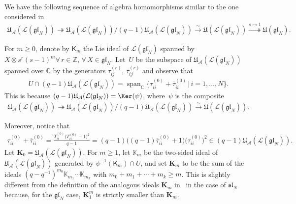 We have the following sequence of algebra homomorphisms similar to the one considered in~\cite{GuMa}
\begin{gather*}
\mathfrak{U}_{\mathcal{A}}(\mathcal{L}(\mathfrak{gl}_N)) \twoheadrightarrow
\mathfrak{U}_{\mathcal{A}}(\mathcal{L}(\mathfrak{gl}_N)) /
(q-1)\mathfrak{U}_{\mathcal{A}}(\mathcal{L}(\mathfrak{gl}_N)) \stackrel{\sim}{\longrightarrow}
\mathfrak{U}(\mathcal{L}(\mathfrak{gl}_N)) \stackrel{s\mapsto 1}{\twoheadrightarrow}
\mathfrak{U}(\mathfrak{gl}_N).
\end{gather*}



For $m\ge 0$, denote by $\mathsf{K}_m$ the Lie ideal of $\mathcal{L}(\mathfrak{gl}_N)$
spanned by $X\otimes s^r (s-1)^m \forall\, r\in\mathbb{Z}$, $\forall\, X\in\mathfrak{gl}_N$.
Let~$U$ be the subspace of $\mathfrak{U}_{\mathcal{A}}(\mathcal{L}(\mathfrak{gl}_N))$ spanned over
$\mathbb{C}$ by the generators $\tau_{ij}^{(r)}$, $\overline{\tau}_{ij}^{(r)}$ and observe that
 \begin{gather*}
 U \cap (q-1){\mathfrak{U}}_{\mathcal{A}}({\mathcal{L}}({\mathfrak{gl}}_N))
 = \operatorname{span}_{\mathbb{C}} \big\{\tau_{ii}^{(0)}
 +\overline{\tau}_{ii}^{(0)} \,\big|\, i=1,\ldots,N\big\}.
\end{gather*}
This is because $(q-1)\mathfrak{U}_{\mathcal{A}}(\mathcal{L}(\mathfrak{gl}_N))=\Ker(\psi)$,
where~$\psi$ is the composite
\begin{gather*}
\mathfrak{U}_{\mathcal{A}}(\mathcal{L}(\mathfrak{gl}_N)) \twoheadrightarrow
\mathfrak{U}_{\mathcal{A}}(\mathcal{L}(\mathfrak{gl}_N)) /
(q-1)\mathfrak{U}_{\mathcal{A}}(\mathcal{L}(\mathfrak{gl}_N)) \stackrel{\sim}{\longrightarrow}
\mathfrak{U}(\mathcal{L}(\mathfrak{gl}_N)).
\end{gather*}

Moreover, notice that
\begin{gather*}
\tau_{ii}^{(0)}+\overline{\tau}_{ii}^{(0)} = \frac{\overline{T}_{ii}^{(0)}\big(T_{ii}^{(0)}-1\big)^2}{q-1} = (q-1)
\big((q-1)\overline{\tau}_{ii}^{(0)}+1\big) \big(\tau_{ii}^{(0)}\big)^2 \in
(q-1)\mathfrak{U}_{\mathcal{A}}(\mathcal{L}(\mathfrak{gl}_N)).
\end{gather*}
Let $\mathbf{K}_0 = \mathfrak{U}_{\mathcal{A}}(\mathcal{L}(\mathfrak{gl}_N))$.
For $m \geq 1$, let $\mathbb{K}_m$ be the two-sided ideal of
$\mathfrak{U}_{\mathcal{A}}(\mathcal{L}(\mathfrak{gl}_N))$ generated by $\psi^{-1}(\mathsf{K}_m) \cap U$, and
set $\mathbf{K}_m$ to be the sum of the ideals $(q-q^{-1})^{m_0}\mathbb{K}_{m_1} \cdots \mathbb{K}_{m_k}$ with $m_0 + m_1
+ \cdots + m_k \ge m$.
This is slightly dif\/ferent from the def\/inition of the analogous ideals $\mathbf{K}_m$ in~\cite{GuMa} in the case of
$\mathfrak{s}\mathfrak{l}_N$ because, for the $\mathfrak{gl}_N$ case, $\mathbf{K}_1^m$ is strictly smaller
than $\mathbf{K}_m$.

